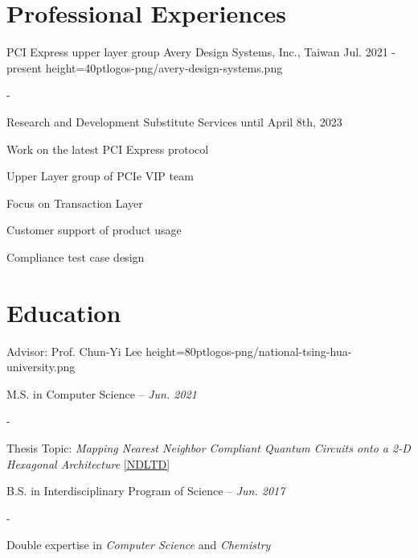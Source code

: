 \documentclass{cvclass}
\begin{document}
\makeinfo


\section{Professional Experiences}

    {PCI Express upper layer group}
    {Avery Design Systems, Inc., Taiwan}
    {Jul. 2021 - present}
    {height=40pt}{logos-png/avery-design-systems.png}
\begin{plainitemize}{-}
    \item Research and Development Substitute Services until April 8th, 2023
    \item Work on the latest PCI Express protocol
    \item Upper Layer group of PCIe VIP team
    \item Focus on Transaction Layer
    \item Customer support of product usage
    \item Compliance test case design
\end{plainitemize}


\section{Education}

        {Advisor: Prof. Chun-Yi Lee}
        {height=80pt}{logos-png/national-tsing-hua-university.png}{
    \item M.S. in Computer Science -- \textit{Jun. 2021}
    \begin{plainitemize}{-}
        \item Thesis Topic: \textit{Mapping Nearest Neighbor Compliant Quantum Circuits onto a 2-D Hexagonal Architecture} \href{https://hdl.handle.net/11296/dpttkc}{[NDLTD]}
    \end{plainitemize}
    \item B.S. in Interdisciplinary Program of Science -- \textit{Jun. 2017}
    \begin{plainitemize}{-}
        \item Double expertise in \textit{Computer Science} and \textit{Chemistry}
    \end{plainitemize}}
\end{document}
